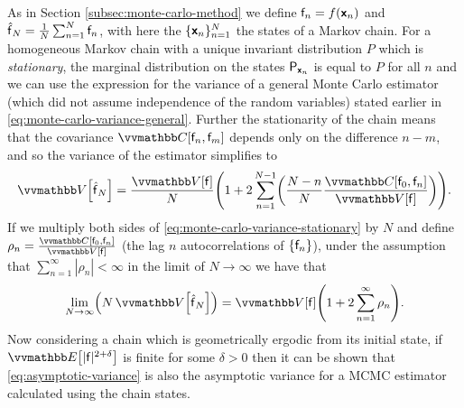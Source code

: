 As in Section \ref{subsec:monte-carlo-method} we define $\mathsf{f}_n = f(\boldsymbol{\mathsf{x}}_n)$ and $\hatf_N = \frac{1}{N} \sum_{n=1}^N \rvar{f}_n$, with here the $\lbrace \boldsymbol{\mathsf{x}}_n \rbrace_{n=1}^N$ the states of a Markov chain. For a homogeneous Markov chain with a unique invariant distribution $P$ which is \emph{stationary}, the marginal distribution on the states $\mathsf{P}_{\boldsymbol{\mathsf{x}}_n}$ is equal to $P$ for all $n$ and we can use the expression for the variance of a general Monte Carlo estimator (which did not assume independence of the random variables) stated earlier in \eqref{eq:monte-carlo-variance-general}. Further the stationarity of the chain means that the covariance $\cov{\rvar{f}_n, \rvar{f}_m}$ depends only on the difference $n - m$, and so the variance of the estimator simplifies to
\begin{equation}\label{eq:monte-carlo-variance-stationary}
  \var{\hatf_N}
  =
  \frac{\var{\rvar{f}}}{N}
  \lpa 
    1 + 2\sum_{n=1}^{N-1} \lpa \frac{N-n}{N} \frac{\cov{\rvar{f}_0, \rvar{f}_n}}{\var{\rvar{f}}}\rpa
  \rpa.
\end{equation}
If we multiply both sides of \eqref{eq:monte-carlo-variance-stationary} by $N$ and define $\rho_{n} = \frac{\cov{\rvar{f}_0, \rvar{f}_n}}{\var{\rvar{f}}}$ (the lag $n$ autocorrelations of $\lbrace \mathsf{f}_n \rbrace$), under the assumption that $\sum_{n=1}^\infty |\rho_n| < \infty$ in the limit of $N \to \infty$ we have that
\begin{equation}\label{eq:asymptotic-variance}
  \lim_{N\to\infty} \lpa N \, \var{\hatf_N} \rpa = \var{\rvar{f}} \lpa 1 + 2\sum_{n=1}^\infty \rho_n\rpa.
\end{equation}
Now considering a chain which is geometrically ergodic from its initial state, if $\expc{|\rvar{f}|^{2+\delta}}$ is finite for some $\delta > 0$ then it can be shown \citep{chan1994discussion,geyer1998markov,roberts2004general} that \eqref{eq:asymptotic-variance} is also the asymptotic variance for a \ac{MCMC} estimator calculated using the chain states.

